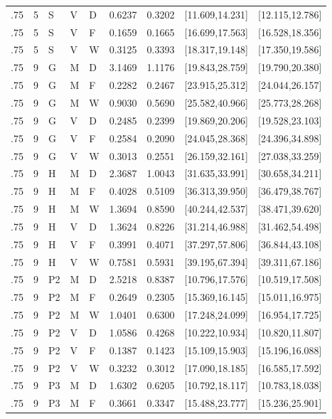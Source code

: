 {\begin{longtable}{rrlllrrll}
.75 & 5 & S & V & D & 0.6237 & 0.3202 & [11.609,14.231] & [12.115,12.786]\\
.75 & 5 & S & V & F & 0.1659 & 0.1665 & [16.699,17.563] & [16.528,18.356]\\
.75 & 5 & S & V & W & 0.3125 & 0.3393 & [18.317,19.148] & [17.350,19.586]\\
.75 & 9 & G & M & D & 3.1469 & 1.1176 & [19.843,28.759] & [19.790,20.380]\\
.75 & 9 & G & M & F & 0.2282 & 0.2467 & [23.915,25.312] & [24.044,26.157]\\
.75 & 9 & G & M & W & 0.9030 & 0.5690 & [25.582,40.966] & [25.773,28.268]\\
.75 & 9 & G & V & D & 0.2485 & 0.2399 & [19.869,20.206] & [19.528,23.103]\\
.75 & 9 & G & V & F & 0.2584 & 0.2090 & [24.045,28.368] & [24.396,34.898]\\
.75 & 9 & G & V & W & 0.3013 & 0.2551 & [26.159,32.161] & [27.038,33.259]\\
.75 & 9 & H & M & D & 2.3687 & 1.0043 & [31.635,33.991] & [30.658,34.211]\\
.75 & 9 & H & M & F & 0.4028 & 0.5109 & [36.313,39.950] & [36.479,38.767]\\
.75 & 9 & H & M & W & 1.3694 & 0.8590 & [40.244,42.537] & [38.471,39.620]\\
.75 & 9 & H & V & D & 1.3624 & 0.8226 & [31.214,46.988] & [31.462,54.498]\\
.75 & 9 & H & V & F & 0.3991 & 0.4071 & [37.297,57.806] & [36.844,43.108]\\
.75 & 9 & H & V & W & 0.7581 & 0.5931 & [39.195,67.394] & [39.311,67.186]\\
.75 & 9 & P2 & M & D & 2.5218 & 0.8387 & [10.796,17.576] & [10.519,17.508]\\
.75 & 9 & P2 & M & F & 0.2649 & 0.2305 & [15.369,16.145] & [15.011,16.975]\\
.75 & 9 & P2 & M & W & 1.0401 & 0.6300 & [17.248,24.099] & [16.954,17.725]\\
.75 & 9 & P2 & V & D & 1.0586 & 0.4268 & [10.222,10.934] & [10.820,11.807]\\
.75 & 9 & P2 & V & F & 0.1387 & 0.1423 & [15.109,15.903] & [15.196,16.088]\\
.75 & 9 & P2 & V & W & 0.3232 & 0.3012 & [17.090,18.185] & [16.585,17.592]\\
.75 & 9 & P3 & M & D & 1.6302 & 0.6205 & [10.792,18.117] & [10.783,18.038]\\
.75 & 9 & P3 & M & F & 0.3661 & 0.3347 & [15.488,23.777] & [15.236,25.901]\\

\end{longtable}}
